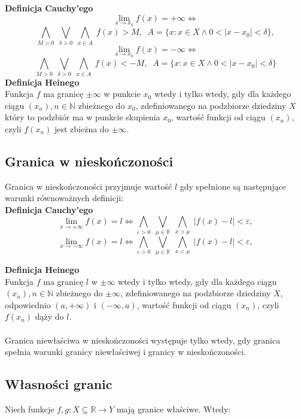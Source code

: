 \documentclass[14pt,a4paper]{extarticle}
\begin{document}
\noindent\textbf{Definicja Cauchy'ego}
$$\lim_{x\to x_{0}} f(x) = +\infty \Leftrightarrow $$
$$\underset{M > 0}{\bigwedge} \;\underset{\delta > 0}{\bigvee} \; \underset{x \in A}{\bigwedge} \; f(x) > M, \;\; A = \{x:x\in X \land 0 < \vert x - x_{0}\vert < \delta\},$$
$$\lim_{x\to x_{0}} f(x) = -\infty \Leftrightarrow $$
$$\underset{M > 0}{\bigwedge} \;\underset{\delta > 0}{\bigvee} \; \underset{x \in A}{\bigwedge} \; f(x) < -M, \;\; A = \{x:x\in X \land 0 < \vert x - x_{0}\vert < \delta\}$$
\noindent\textbf{Definicja Heinego}\\
Funkcja $f$ ma granicę $\pm\infty$ w punkcie $x_{0}$ wtedy i tylko wtedy,
gdy dla każdego ciągu $(x_{n}), n \in \mathbb{N}$ zbieżnego do $x_{0}$, zdefiniowanego na podzbiorze dziedziny $X$ który
to podzbiór ma w punkcie skupienia $x_{0}$, wartość funkcji od ciągu $(x_{n})$, czyli $f(x_{n})$ jest zbieżna do $\pm\infty$.


\subsection{Granica w nieskończoności}
Granica w nieskończoności przyjmuje wartość $l$ gdy spełnione są następujące warunki równoważnych definicji:\\

\noindent\textbf{Definicja Cauchy'ego}
$$\lim_{x\to +\infty} f(x) = l \Leftrightarrow \underset{\varepsilon > 0}{\bigwedge} \;\underset{\mu \in \mathbb{R}}{\bigvee} \; \underset{x > \mu}{\bigwedge} \; \vert f(x) - l \vert < \varepsilon,$$
\nopagebreak[4]
$$\lim_{x\to -\infty} f(x) = l \Leftrightarrow \underset{\varepsilon > 0}{\bigwedge} \;\underset{\mu \in \mathbb{R}}{\bigvee} \; \underset{x < \mu}{\bigwedge} \; \vert f(x) - l \vert < \varepsilon,$$

\noindent\textbf{Definicja Heinego}\\
Funkcja $f$ ma granicę $l$ w $\pm\infty$ wtedy i tylko wtedy,
gdy dla każdego ciągu $(x_{n}), n \in \mathbb{N}$ zbieżnego do $\pm\infty$, zdefiniowanego na podzbiorze dziedziny $X$, 
odpowiednio $(a, +\infty)$ i $(-\infty, a)$, wartość funkcji od ciągu $(x_{n})$, czyli $f(x_{n})$ dąży do $l$.\\\\

\noindent Granica niewłaściwa w nieskończoności występuje tylko wtedy, gdy granica spełnia warunki granicy niewłaściwej i granicy w nieskończoności.\\

\subsection{Własności granic}
\noindent Niech funkcje $f,g :X \subseteq \mathbb{R} \rightarrow Y$ mają granice właściwe. Wtedy:
\end{document}
